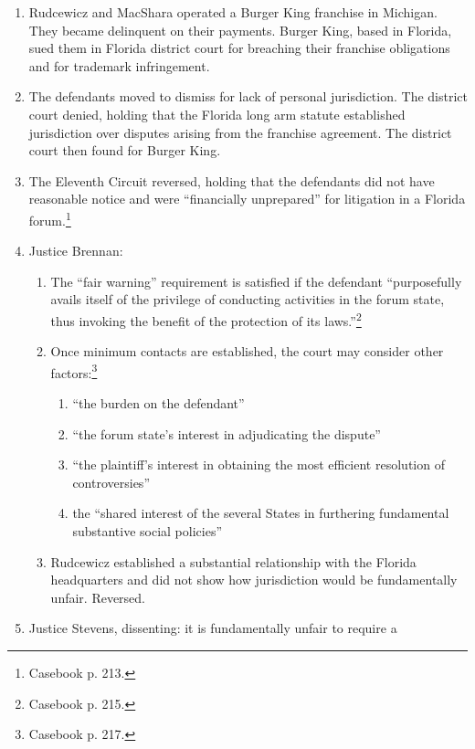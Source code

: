 \begin{enumerate}
    \item Rudcewicz and MacShara operated a Burger King franchise in Michigan. 
    They became delinquent on their payments. Burger King, based in Florida, 
    sued them in Florida district court for breaching their franchise 
    obligations and for trademark infringement.
    \item The defendants moved to dismiss for lack of personal jurisdiction. 
    The district court denied, holding that the Florida long arm statute 
    established jurisdiction over disputes arising from the franchise 
    agreement. The district court then found for Burger King.
    \item The Eleventh Circuit reversed, holding that the defendants did not 
    have reasonable notice and were ``financially unprepared'' for litigation 
    in a Florida forum.\footnote{Casebook p. 213.}
    \item Justice Brennan:
    \begin{enumerate}
        \item The ``fair warning'' requirement is satisfied if the defendant 
        ``purposefully avails itself of the privilege of conducting activities 
        in the forum state, thus invoking the benefit of the protection of its 
        laws.''\footnote{Casebook p. 215.}
        \item Once minimum contacts are established, the court may consider 
        other factors:\footnote{Casebook p. 217.}
        \begin{enumerate}
            \item ``the burden on the defendant''
            \item ``the forum state's interest in adjudicating the dispute''
            \item ``the plaintiff's interest in obtaining the most efficient 
            resolution of controversies''
            \item the ``shared interest of the several States in furthering 
            fundamental substantive social policies''
        \end{enumerate}
        \item Rudcewicz established a substantial relationship with the 
        Florida headquarters and did not show how jurisdiction would be 
        fundamentally unfair. Reversed.
    \end{enumerate}
    \item Justice Stevens, dissenting: it is fundamentally unfair to require a 

\end{enumerate}
